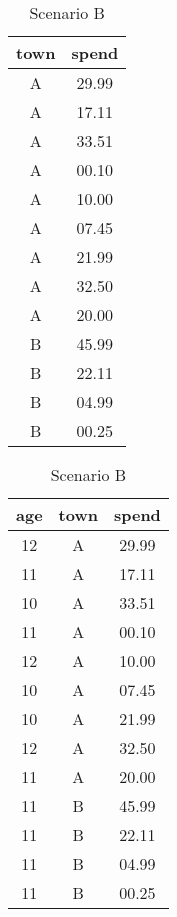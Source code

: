 \documentclass[a4paper, 11pt]{article}
\begin{document}
\begin{table}[hbtp]
    \centering
    \begin{minipage}{0.2\textwidth}
    \centering
    \begin{tabular}{c|c}
        town & spend \\
        \hline
        A    & 29.99 \\
        A    & 17.11 \\
        A    & 33.51 \\
        A    & 00.10 \\
        A    & 10.00 \\
        A    & 07.45 \\
        A    & 21.99 \\
        A    & 32.50 \\
        A    & 20.00 \\
        B    & 45.99 \\
        B    & 22.11 \\
        B    & 04.99 \\
        B    & 00.25 \\
    \end{tabular}
    \caption{Scenario A}
    \end{minipage}
    \begin{minipage}{0.3\textwidth}
    \centering
    \begin{tabular}{cc|c}
         age & town & spend \\
        \hline
        12  & A    & 29.99 \\
        11  & A    & 17.11 \\
        10  & A    & 33.51 \\
        11  & A    & 00.10 \\
        12  & A    & 10.00 \\
        10  & A    & 07.45 \\
        10  & A    & 21.99 \\
        12  & A    & 32.50 \\
        11  & A    & 20.00 \\
        11  & B    & 45.99 \\
        11  & B    & 22.11 \\
        11  & B    & 04.99 \\
        11  & B    & 00.25 \\
    \end{tabular}
     \caption{Scenario B}
    \end{minipage}

\end{table}
\end{document}
